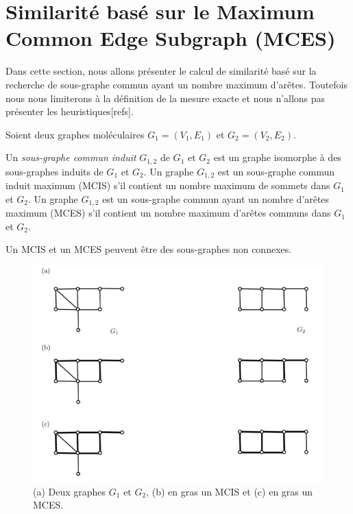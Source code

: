 \section{Similarité basé sur le Maximum Common Edge Subgraph (MCES)}
\label{mces}
Dans cette section, nous allons présenter le calcul de similarité basé sur la recherche de sous-graphe commun ayant un nombre maximum d'arêtes. Toutefois nous nous limiterons à la définition de la mesure exacte et nous n'allons pas présenter les heuristiques[refs].

Soient deux graphes moléculaires $G_1=(V_1,E_1)$ et $G_2=(V_2,E_2)$. 

\begin{definition}
Un \textit{sous-graphe commun induit} $G_{1,2}$ de $G_1$ et $G_2$ est un graphe isomorphe à des sous-graphes induits de $G_1$ et $G_2$. Un graphe $G_{1,2}$ est un sous-graphe commun induit maximum (MCIS) s'il contient un nombre maximum de sommets dans $G_1$ et $G_2$. Un graphe $G_{1,2}$ est un sous-graphe commun ayant un nombre d'arêtes maximum (MCES) s'il contient un nombre maximum d'arêtes communs dans $G_1$ et $G_2$.
\end{definition}

Un MCIS et un MCES peuvent être des sous-graphes non connexes.
\begin{figure}[H]
\label{mcis-mces}

\caption{(a) Deux graphes $G_1$ et $G_2$, (b) en gras un MCIS et (c) en gras un MCES.}
\begin{center}
\includegraphics[scale=0.5]{mces_mcis.png}
\end{center}
\end{figure}

